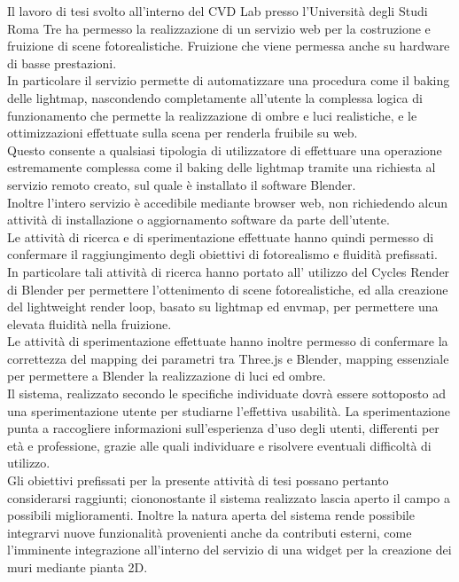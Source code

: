 Il lavoro di tesi svolto all’interno del CVD Lab presso l’Università degli Studi Roma Tre ha permesso la realizzazione di un servizio web per la costruzione e fruizione di scene fotorealistiche. Fruizione che viene permessa anche su hardware di basse prestazioni.
\\
In particolare il servizio permette di automatizzare una procedura come il baking delle lightmap, nascondendo completamente all’utente la complessa logica di funzionamento che permette la realizzazione di ombre e luci realistiche, e le ottimizzazioni effettuate sulla scena per renderla fruibile su web. 
\\
Questo consente a qualsiasi tipologia di utilizzatore di effettuare una operazione estremamente complessa come il baking delle lightmap tramite una richiesta al servizio remoto creato, sul quale è installato il software Blender.
\\
Inoltre l’intero servizio è accedibile mediante browser web, non richiedendo alcun attività di installazione o aggiornamento software da parte dell’utente.
\\
Le attività di ricerca e di sperimentazione effettuate hanno quindi permesso di confermare il raggiungimento degli obiettivi di fotorealismo e fluidità prefissati. 
\\
In particolare tali attività di ricerca hanno portato all’ utilizzo del Cycles Render di Blender per permettere l’ottenimento di scene fotorealistiche, ed alla creazione del lightweight render loop, basato su lightmap ed envmap, per permettere una elevata fluidità nella fruizione.
\\
Le attività di sperimentazione effettuate hanno inoltre permesso di confermare la correttezza del mapping dei parametri tra Three.js e Blender, mapping essenziale per permettere a Blender la realizzazione di luci ed ombre.
\\
Il sistema, realizzato secondo le specifiche individuate dovrà essere sottoposto ad una sperimentazione utente per studiarne l’effettiva usabilità. La sperimentazione punta a raccogliere informazioni sull’esperienza d’uso degli utenti, differenti per età e professione, grazie alle quali individuare e risolvere eventuali difficoltà di utilizzo.
\\
Gli obiettivi prefissati per la presente attività di tesi possano pertanto considerarsi raggiunti; ciononostante il sistema realizzato lascia aperto il campo a possibili miglioramenti. 
Inoltre la natura aperta del sistema rende possibile integrarvi nuove funzionalità provenienti anche da contributi esterni, come l’imminente integrazione all’interno del servizio di una widget per la creazione dei muri mediante pianta 2D. 

